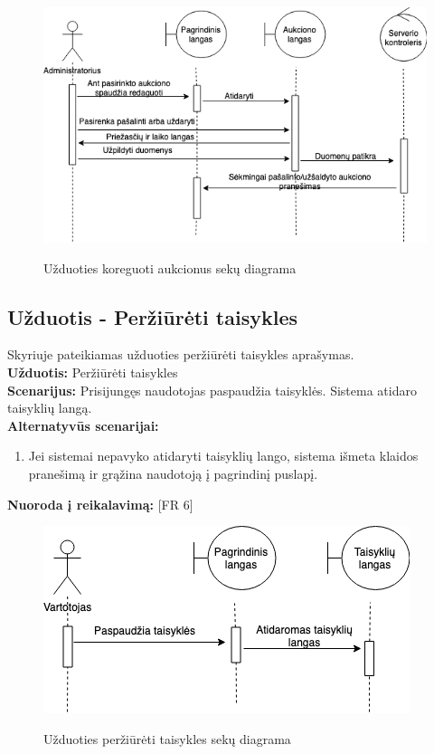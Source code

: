 \documentclass{VUMIFPSkursinis}
\begin{document}
	
		\begin{figure}[H]
		\centering
		\includegraphics[width=\linewidth]{img/editAuctionAdminSequence.png}
		\label{fig:aukckoreg}
		\caption{Užduoties koreguoti aukcionus sekų diagrama}
	\end{figure}

	\subsection{Užduotis - Peržiūrėti taisykles}
	Skyriuje pateikiamas užduoties peržiūrėti taisykles aprašymas.\\
	\textbf{Užduotis:}  Peržiūrėti taisykles \\
	\textbf{Scenarijus:}  Prisijungęs naudotojas paspaudžia taisyklės. Sistema atidaro taisyklių langą. \\
	\textbf{Alternatyvūs scenarijai:}
	\begin{enumerate}
		\item Jei sistemai nepavyko atidaryti taisyklių lango, sistema išmeta klaidos pranešimą ir grąžina naudotoją į pagrindinį puslapį.
	\end{enumerate}
	\textbf{Nuoroda į reikalavimą: } [FR 6]
	
			\begin{figure}[H]
		\centering
		\includegraphics[width=\linewidth]{img/rulesSequence.png}
		\label{fig:taisykles}
		\caption{Užduoties peržiūrėti taisykles sekų diagrama}
	\end{figure}
\end{document}
